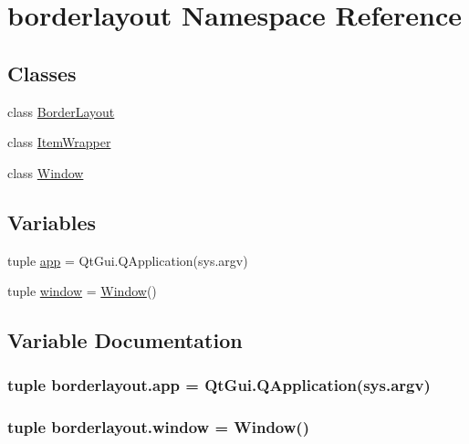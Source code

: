 \hypertarget{namespaceborderlayout}{}\section{borderlayout Namespace Reference}
\label{namespaceborderlayout}
\subsection*{Classes}
\begin{DoxyCompactItemize}
\item 
class \hyperlink{classborderlayout_1_1BorderLayout}{Border\+Layout}
\item 
class \hyperlink{classborderlayout_1_1ItemWrapper}{Item\+Wrapper}
\item 
class \hyperlink{classborderlayout_1_1Window}{Window}
\end{DoxyCompactItemize}
\subsection*{Variables}
\begin{DoxyCompactItemize}
\item 
tuple \hyperlink{namespaceborderlayout_af476dec10a9150f6b16a05c0f54dc7a5}{app} = Qt\+Gui.\+Q\+Application(sys.\+argv)
\item 
tuple \hyperlink{namespaceborderlayout_a9482b88d855ee2ffd6735a524a00d16a}{window} = \hyperlink{classborderlayout_1_1Window}{Window}()
\end{DoxyCompactItemize}


\subsection{Variable Documentation}
\hypertarget{namespaceborderlayout_af476dec10a9150f6b16a05c0f54dc7a5}{}
\subsubsection[{app}]{\setlength{\rightskip}{0pt plus 5cm}tuple borderlayout.\+app = Qt\+Gui.\+Q\+Application(sys.\+argv)}\label{namespaceborderlayout_af476dec10a9150f6b16a05c0f54dc7a5}
\hypertarget{namespaceborderlayout_a9482b88d855ee2ffd6735a524a00d16a}{}
\subsubsection[{window}]{\setlength{\rightskip}{0pt plus 5cm}tuple borderlayout.\+window = {\bf Window}()}\label{namespaceborderlayout_a9482b88d855ee2ffd6735a524a00d16a}
